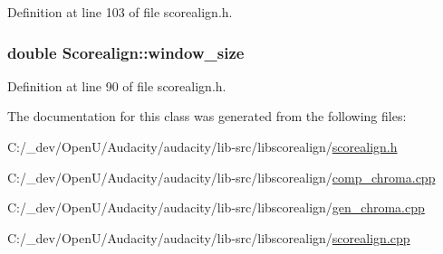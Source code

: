 Definition at line 103 of file scorealign.\+h.

\subsubsection[{\texorpdfstring{window\+\_\+size}{window_size}}]{\setlength{\rightskip}{0pt plus 5cm}double Scorealign\+::window\+\_\+size}\hypertarget{class_scorealign_a303f57cd6200fd229f7f92fb0bfa95bc}{}\label{class_scorealign_a303f57cd6200fd229f7f92fb0bfa95bc}


Definition at line 90 of file scorealign.\+h.



The documentation for this class was generated from the following files\+:\begin{DoxyCompactItemize}
\item 
C\+:/\+\_\+dev/\+Open\+U/\+Audacity/audacity/lib-\/src/libscorealign/\hyperlink{scorealign_8h}{scorealign.\+h}\item 
C\+:/\+\_\+dev/\+Open\+U/\+Audacity/audacity/lib-\/src/libscorealign/\hyperlink{comp__chroma_8cpp}{comp\+\_\+chroma.\+cpp}\item 
C\+:/\+\_\+dev/\+Open\+U/\+Audacity/audacity/lib-\/src/libscorealign/\hyperlink{gen__chroma_8cpp}{gen\+\_\+chroma.\+cpp}\item 
C\+:/\+\_\+dev/\+Open\+U/\+Audacity/audacity/lib-\/src/libscorealign/\hyperlink{scorealign_8cpp}{scorealign.\+cpp}\end{DoxyCompactItemize}
